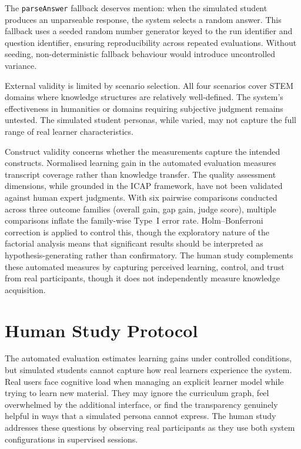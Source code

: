 \documentclass[logo,bsc,singlespacing,parskip,online]{infthesis}
\begin{document}
The \texttt{parseAnswer} fallback deserves mention: when the simulated student produces an unparseable response, the system selects a random answer. This fallback uses a seeded random number generator keyed to the run identifier and question identifier, ensuring reproducibility across repeated evaluations. Without seeding, non-deterministic fallback behaviour would introduce uncontrolled variance.

External validity is limited by scenario selection. All four scenarios cover STEM domains where knowledge structures are relatively well-defined. The system's effectiveness in humanities or domains requiring subjective judgment remains untested. The simulated student personas, while varied, may not capture the full range of real learner characteristics.

Construct validity concerns whether the measurements capture the intended constructs. Normalised learning gain in the automated evaluation measures transcript coverage rather than knowledge transfer. The quality assessment dimensions, while grounded in the ICAP framework, have not been validated against human expert judgments. With six pairwise comparisons conducted across three outcome families (overall gain, gap gain, judge score), multiple comparisons inflate the family-wise Type~I error rate. Holm--Bonferroni correction is applied to control this, though the exploratory nature of the factorial analysis means that significant results should be interpreted as hypothesis-generating rather than confirmatory. The human study complements these automated measures by capturing perceived learning, control, and trust from real participants, though it does not independently measure knowledge acquisition.

\section{Human Study Protocol}
\label{sec:human-study}

The automated evaluation estimates learning gains under controlled conditions, but simulated students cannot capture how real learners experience the system. Real users face cognitive load when managing an explicit learner model while trying to learn new material. They may ignore the curriculum graph, feel overwhelmed by the additional interface, or find the transparency genuinely helpful in ways that a simulated persona cannot express. The human study addresses these questions by observing real participants as they use both system configurations in supervised sessions.
\end{document}
